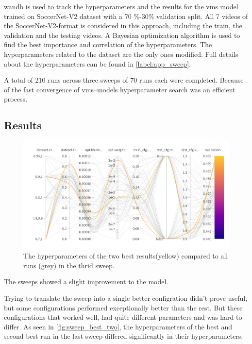 \acrlong{wandb} is used to track the hyperparameters and the results for the \acrshort{vms} model trained on SoccerNet-V2 dataset with a 70 \(\%\)-30\(\%\) validation split. All 7 videos of the SoccerNet-V2-format is considered in this approach, including the train, the validation and the testing videos. A Bayesian optimization algorithm is used to find the best importance and correlation of the hyperparameters. The hyperparameters related to the dataset are the only ones modified. Full details about the hyperparameters can be found in \autoref{label:app_sweep}.

A total of 210 runs across three sweeps of 70 runs each were completed. Because of the fast convergence of \acrshort{vms}--models hyperparameter search was an efficient process. 


\subsection{Results}
\label{ssec:ex4_results}

\begin{figure}[ht]
    \centering
    \includegraphics[width=1\linewidth]{figures/sweep_two_best.png}
    \caption{The hyperparameters of the two best results(yellow) compared to all runs (grey) in the thrid sweep. }
    \label{fig:sweep_best_two}
\end{figure}

The sweeps showed a slight improvement to the model. 

Trying to translate the sweep into a single better configration didn't prove useful, but some configurations performed exceptionally better than the rest. But these configurations that worked well, had quite different parameters and was hard to differ. As seen in \autoref{fig:sweep_best_two}, the hyperparameters of the best and second best run in the last sweep differed significantly in their hyperparameters. 

